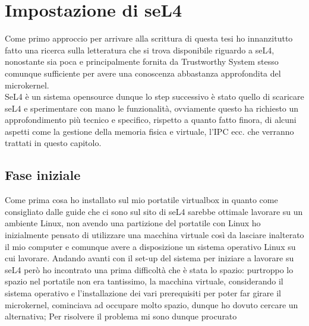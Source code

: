 \chapter{Impostazione di seL4}
Come primo approccio per arrivare alla scrittura di questa tesi ho innanzitutto fatto una ricerca sulla letteratura che si trova disponibile riguardo a seL4, nonostante sia poca e principalmente fornita da Trustworthy System stesso comunque sufficiente per avere una conoscenza abbastanza approfondita del microkernel.\\
SeL4 è un sistema opensource dunque lo step successivo è stato quello di scaricare seL4 e sperimentare con mano le funzionalità, ovviamente questo ha richiesto un approfondimento più tecnico e specifico, rispetto a quanto fatto finora, di alcuni aspetti come la gestione della memoria fisica e virtuale, l'IPC ecc. che verranno trattati in questo capitolo.

\section{Fase iniziale}
Come prima cosa ho installato sul mio portatile virtualbox in quanto come consigliato dalle guide che ci sono sul sito di seL4 sarebbe ottimale lavorare su un ambiente Linux, non avendo una partizione del portatile con Linux ho inizialmente pensato di utilizzare una macchina virtuale così da lasciare inalterato il mio computer e comunque avere a disposizione un sistema operativo Linux su cui lavorare. Andando avanti con il set-up del sistema per iniziare a lavorare su seL4 però ho incontrato una prima difficoltà che è stata lo spazio: purtroppo lo spazio nel portatile non era tantissimo, la macchina virtuale, considerando il sistema operativo e l'installazione dei vari prerequisiti per poter far girare il microkernel, cominciava ad occupare molto spazio, dunque ho dovuto cercare un alternativa; Per risolvere il problema mi sono dunque procurato 